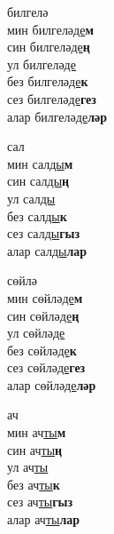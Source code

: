 \begin{multicols}{4}
\begin{enumerate}
\begin{minipage}{\linewidth}
    \item
    билгелә\\
    мин билгелә\underline{де}\textbf{м}\\
    син билгелә\underline{де}\textbf{ң}\\
    ул билгелә\underline{де}\\
    без билгелә\underline{де}\textbf{к}\\
    сез билгелә\underline{де}\textbf{гез}\\
    алар билгелә\underline{де}\textbf{ләр}\\
\end{minipage}

\begin{minipage}{\linewidth}
    \item
    сал\\
    мин сал\underline{ды}\textbf{м}\\
    син сал\underline{ды}\textbf{ң}\\
    ул сал\underline{ды}\\
    без сал\underline{ды}\textbf{к}\\
    сез сал\underline{ды}\textbf{гыз}\\
    алар сал\underline{ды}\textbf{лар}\\
\end{minipage}

\begin{minipage}{\linewidth}
    \item
    сөйлә\\
    мин сөйлә\underline{де}\textbf{м}\\
    син сөйлә\underline{де}\textbf{ң}\\
    ул сөйлә\underline{де}\\
    без сөйлә\underline{де}\textbf{к}\\
    сез сөйлә\underline{де}\textbf{гез}\\
    алар сөйлә\underline{де}\textbf{ләр}\\
\end{minipage}

\begin{minipage}{\linewidth}
    \item
    ач\\
    мин ач\underline{ты}\textbf{м}\\
    син ач\underline{ты}\textbf{ң}\\
    ул ач\underline{ты}\\
    без ач\underline{ты}\textbf{к}\\
    сез ач\underline{ты}\textbf{гыз}\\
    алар ач\underline{ты}\textbf{лар}\\
\end{minipage}


\end{enumerate}
\end{multicols}
